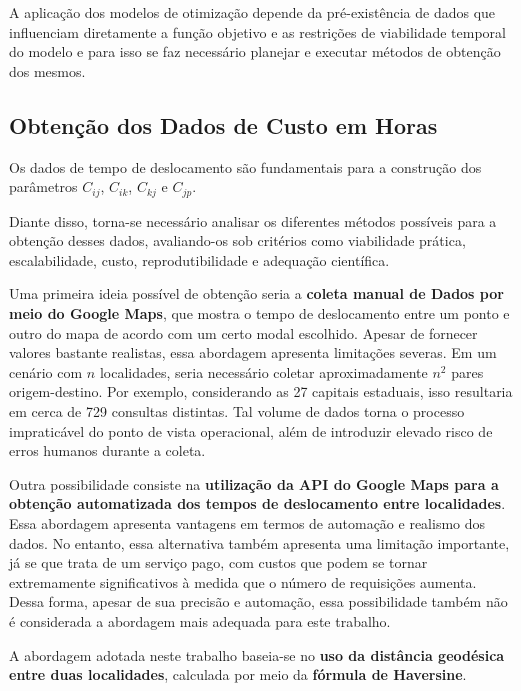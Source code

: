 A aplicação dos modelos de otimização depende da pré-existência de dados que influenciam diretamente a função objetivo e as restrições de viabilidade temporal do modelo e para isso se faz necessário planejar e executar métodos de obtenção dos mesmos.

\subsection{Obtenção dos Dados de Custo em Horas}

Os dados de tempo de deslocamento são fundamentais para a construção dos parâmetros $C_{ij}$, $C_{ik}$,  $C_{kj}$ e $C_{jp}$.

Diante disso, torna-se necessário analisar os diferentes métodos possíveis para a obtenção desses dados, avaliando-os sob critérios como viabilidade prática, escalabilidade, custo, reprodutibilidade e adequação científica.

Uma primeira ideia possível de obtenção seria a \textbf{coleta manual de Dados por meio do Google Maps}, que mostra o tempo de deslocamento entre um ponto e outro do mapa de acordo com um certo modal escolhido. Apesar de fornecer valores bastante realistas, essa abordagem apresenta limitações severas. Em um cenário com $n$ localidades, seria necessário coletar aproximadamente $n^2$ pares origem-destino. Por exemplo, considerando as 27 capitais estaduais, isso resultaria em cerca de 729 consultas distintas. Tal volume de dados torna o processo impraticável do ponto de vista operacional, além de introduzir elevado risco de erros humanos durante a coleta.


Outra possibilidade consiste na \textbf{utilização da API do Google Maps para a obtenção automatizada dos tempos de deslocamento entre localidades}. Essa abordagem apresenta vantagens em termos de automação e realismo dos dados. No entanto, essa alternativa também apresenta uma limitação importante, já se que trata de um serviço pago, com custos que podem se tornar extremamente significativos à medida que o número de requisições aumenta. Dessa forma, apesar de sua precisão e automação, essa possibilidade também não é considerada a abordagem mais adequada para este trabalho.


A abordagem adotada neste trabalho baseia-se no \textbf{uso da distância geodésica entre duas localidades}, calculada por meio da \textbf{fórmula de Haversine}. \cite{Wiki:Haversine}

